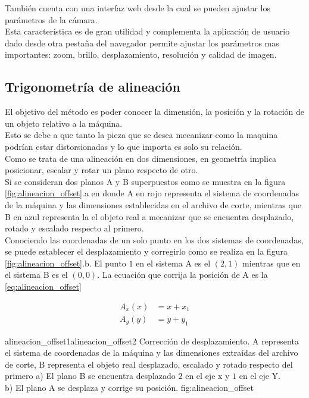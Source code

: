   También cuenta con una interfaz web desde la cual se pueden ajustar los parámetros de la cámara.\\
  Esta característica es de gran utilidad y complementa la aplicación de usuario dado desde otra pestaña del navegador permite ajustar los parámetros mas importantes: zoom, brillo, desplazamiento, resolución y calidad de imagen.\\


\subsection{Trigonometría de alineación}

   El objetivo del método es poder conocer la dimensión, la posición y la rotación de un objeto relativo a la máquina. \\
Esto se debe a que tanto la pieza que se desea mecanizar como la maquina podrían estar distorsionadas y lo que importa es solo su relación. \\
   Como se trata de una alineación en dos dimensiones, en geometría implica posicionar, escalar y rotar un plano respecto de otro.\\
   Si se consideran dos planos A y B superpuestos como se muestra en la figura \ref{fig:alineacion_offset}.a en donde A en rojo representa el sistema de coordenadas de la máquina y las dimensiones establecidas en el archivo de corte, mientras que B en azul representa la el objeto real a mecanizar que se encuentra desplazado, rotado y escalado respecto al primero. \\
   Conociendo las coordenadas de un solo punto en los dos sistemas de coordenadas, se puede establecer el desplazamiento y corregirlo como se realiza en la figura \ref{fig:alineacion_offset}.b. El punto $1$ en el sistema A es el $(2,1)$ mientras que en el sistema B es el $(0,0)$.
   La ecuación que corrija la posición de A es la \ref{eq:alineacion_offset}

   \begin{equation}
      \begin{aligned}
         A_x(x) &= x+x_1 \\
         A_y(y) &= y+y_1
      \end{aligned}
      \label{eq:alineacion_offset}
   \end{equation}

         {alineacion_offset1}{alineacion_offset2}
         {Corrección de desplazamiento. A representa el sistema de coordenadas de la máquina y las dimensiones extraídas del archivo de corte, B representa el objeto real desplazado, escalado y rotado respecto del primero a) El plano B se encuentra desplazado $2$ en el eje x y $1$ en el eje Y.\\ b) El plano A se desplaza y corrige su posición.}
         {fig:alineacion_offset}

